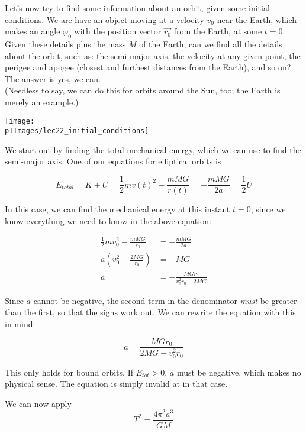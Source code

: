 Let's now try to find some information about an orbit, given some initial conditions. We are have an object moving at a velocity $v_0$ near the Earth, which makes an angle $\varphi_0$ with the position vector $\vec{r_0}$ from the Earth, at some $t = 0$. Given these details plus the mass $M$ of the Earth, can we find all the details about the orbit, such as: the semi-major axis, the velocity at any given point, the perigee and apogee (closest and furthest distances from the Earth), and so on? The answer is yes, we can.\\
(Needless to say, we can do this for orbits around the Sun, too; the Earth is merely an example.)

\begin{center}
\texttt{[image: \\pIImages/lec22\_initial\_conditions]}
\end{center}

We start out by finding the total mechanical energy, which we can use to find the semi-major axis. One of our equations for elliptical orbits is

\begin{equation}
E_{total} = K + U = \frac{1}{2} m v(t)^2 - \frac{m M G}{r(t)} = - \frac{m M G}{2a} = \frac{1}{2} U
\end{equation}

In this case, we can find the mechanical energy at this instant $t = 0$, since we know everything we need to know in the above equation:

\begin{align}
\frac{1}{2} m v_0^2 - \frac{m M G}{r_0} &= -\frac{m M G}{2a}\\
a \left(v_0^2 - \frac{2 M G}{r_0}\right) &= -M G\\
a &= -\frac{M G r_0}{v_0^2 r_0 - 2 M G}
\end{align}

Since $a$ cannot be negative, the second term in the denominator \emph{must} be greater than the first, so that the signs work out. We can rewrite the equation with this in mind:

\begin{equation}
a = \frac{M G r_0}{2 M G - v_0^2 r_0}
\end{equation}

This only holds for bound orbits. If $E_{tot} > 0$, $a$ must be negative, which makes no physical sense. The equation is simply invalid at in that case.

We can now apply
\begin{equation}
T^2 = \frac{4 \pi^2 a^3}{G M}
\end{equation}


